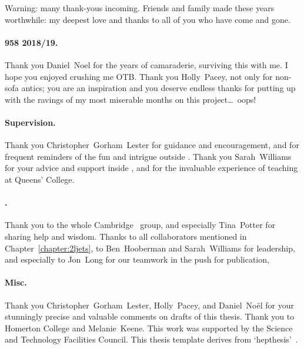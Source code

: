 \begin{acknowledgements}
Warning: many thank-yous incoming.
Friends and family made these years worthwhile:
my deepest love and thanks to all of you who have come and gone.

\paragraph{958 2018/19.}
Thank you Daniel~Noel for the years of camaraderie, surviving this with me.
I hope you enjoyed crushing me OTB.
Thank you Holly~Pacey, not only for non-sofa antics; you are an inspiration
and you deserve endless thanks for putting up with the ravings of my most
miserable months on this project\ldots\ oops!

\paragraph{Supervision.}
Thank you Christopher~Gorham~Lester for guidance and encouragement,
and for frequent reminders of the fun and intrigue outside \atlas.
Thank you Sarah~Williams for your advice and support inside \atlas, and
for the invaluable experience of teaching at Queens' College.

\paragraph{\atlas.}
Thank you to the whole Cambridge \atlas\ group, and especially Tina~Potter for
sharing help and wisdom.
Thanks to all collaborators mentioned in Chapter~\ref{chapter:2ljets},
to Ben~Hooberman and Sarah~Williams for leadership, and especially to
Jon~Long for our teamwork in the push for publication,

\paragraph{Misc.}
Thank you Christopher~Gorham~Lester, Holly~Pacey, and Daniel~No\"el for your
stunningly precise and valuable comments on drafts of this thesis.
Thank you to Homerton College and Melanie~Keene.
This work was supported by the Science and Technology Facilities Council.
This thesis template derives from `hepthesis'~\cite{hepthesis}.
\end{acknowledgements}


